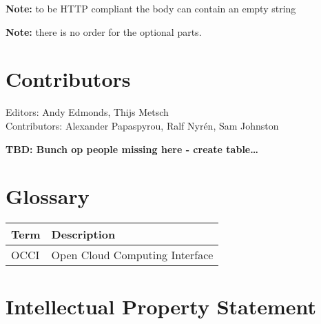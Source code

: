 \documentclass[10pt,a4paper]{article}
\begin{document}
\textbf{Note:} to be HTTP compliant the body can contain an empty string

\textbf{Note:} there is no order for the optional parts.

%



%
%
%
%
%
%

\section{Contributors}

Editors: Andy Edmonds, Thijs Metsch \\
Contributors: Alexander Papaspyrou, Ralf Nyrén, Sam Johnston

\textbf{TBD: Bunch op people missing here - create table\ldots}

\section{Glossary}

\begin{tabular}{l|l}
Term & Description \\
\hline
OCCI & Open Cloud Computing Interface
\end{tabular}

\section{Intellectual Property Statement}
\end{document}
